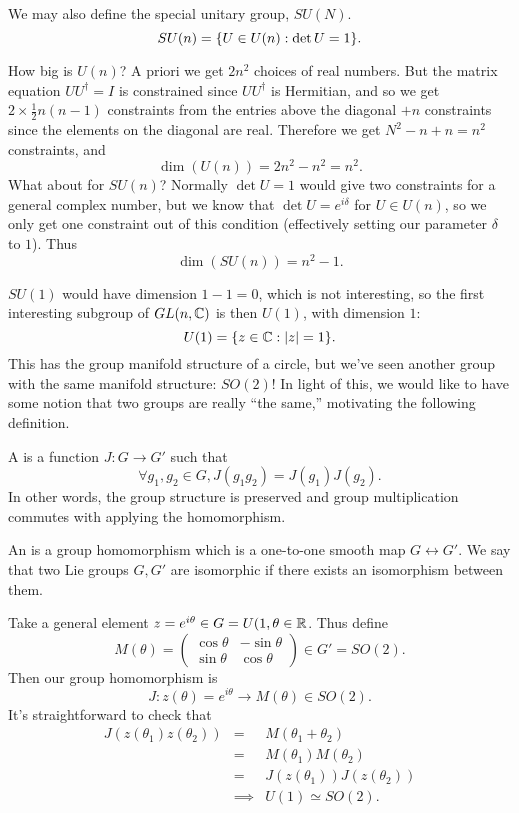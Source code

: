 \begin{defn}
We may also define the special unitary group, $SU(N)$.
$$SU(n)=\{U\in  U(n) : \det U = 1\}.$$
\end{defn}

How big is $U(n)$? A priori we get $2n^2$ choices of real numbers. But the matrix equation $UU^\dagger=I$ is constrained since $U U^\dagger$ is Hermitian, and so we get $2\times \frac{1}{2}n(n-1)$ constraints from the entries above the diagonal $+n$ constraints since the elements on the diagonal are real. Therefore we get $N^2-n+n=n^2$ constraints, and
$$\dim(U(n))=2n^2-n^2 = n^2.$$
What about for $SU(n)$? Normally $\det U =1$ would give two constraints for a general complex number, but we know that $\det U = e^{i\delta}$ for $U\in U(n)$, so we only get one constraint out of this condition (effectively setting our parameter $\delta$ to $1$). Thus
$$\dim(SU(n))=n^2 -1.$$

\begin{exm}
$SU(1)$ would have dimension $1-1=0$, which is not interesting, so the first interesting subgroup of $GL(n,\mathbb{C})$ is then $U(1)$, with dimension $1$:
$$U(1)=\{z\in \mathbb{C} : |z|=1\}.$$
This has the group manifold structure of a circle, but we've seen another group with the same manifold structure: $SO(2)$! In light of this, we would like to have some notion that two groups are really ``the same,'' motivating the following definition.
\end{exm}
\begin{defn}
A  is a function $J:G\to G'$ such that
$$\forall g_1, g_2 \in G, J(g_1g_2)=J(g_1)J(g_2).$$
In other words, the group structure is preserved and group multiplication commutes with applying the homomorphism.
\end{defn}
\begin{defn}
An  is a group homomorphism which is a one-to-one smooth map $G\leftrightarrow G'$. We say that two Lie groups $G,G'$ are isomorphic if there exists an isomorphism between them.
\end{defn}

\begin{exm}
Take a general element $z=e^{i\theta}\in G= U(1, \theta \in \mathbb{R}$. Thus define
$$M(\theta)=\begin{pmatrix}
\cos\theta& - \sin\theta\\
\sin\theta & \cos\theta
\end{pmatrix} \in G'=SO(2).$$
Then our group homomorphism is 
$$J:z(\theta)= e^{i\theta} \to M(\theta) \in SO(2).$$
It's straightforward to check that
\begin{eqnarray*}
J(z(\theta_1)z(\theta_2)) &=& M(\theta_1+\theta_2)\\
&=&M(\theta_1)M(\theta_2)\\
&=&J(z(\theta_1))J(z(\theta_2))\\
&\implies& U(1) \simeq SO(2).
\end{eqnarray*}
\end{exm}

